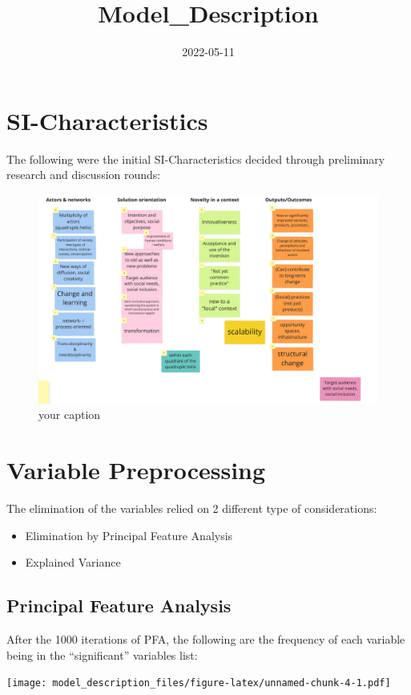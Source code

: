 \documentclass[
]{article}
\title{Model\_Description}
\author{}
\date{\vspace{-2.5em}2022-05-11}
\begin{document}
\maketitle

\hypertarget{si-characteristics}{%
\section{SI-Characteristics}\label{si-characteristics}}

The following were the initial SI-Characteristics decided through
preliminary research and discussion rounds:

\begin{figure}

{\centering \includegraphics[width=0.3\linewidth]{../06_model/SIVOCS - SI characteristics} 

}

\caption{your caption}\label{fig:unnamed-chunk-2}
\end{figure}

\hypertarget{variable-preprocessing}{%
\section{Variable Preprocessing}\label{variable-preprocessing}}

The elimination of the variables relied on 2 different type of
considerations:

\begin{itemize}
\item
  Elimination by Principal Feature Analysis
\item
  Explained Variance
\end{itemize}

\hypertarget{principal-feature-analysis}{%
\subsection{Principal Feature
Analysis}\label{principal-feature-analysis}}

After the 1000 iterations of PFA, the following are the frequency of
each variable being in the ``significant'' variables list:

\texttt{[image: model\_description\_files/figure-latex/unnamed-chunk-4-1.pdf]}
\end{document}
